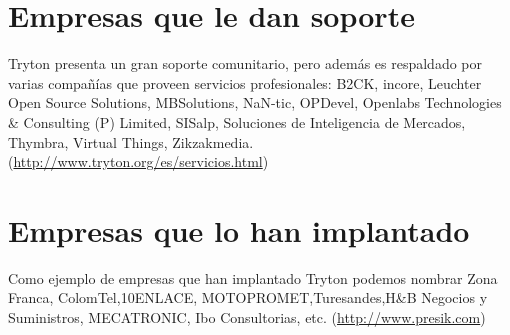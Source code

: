 \documentclass{article}
\begin{document}

\section{Empresas que le dan soporte}

Tryton presenta un gran soporte comunitario, pero además es respaldado por varias compañías que proveen servicios profesionales:
B2CK, incore, Leuchter Open Source Solutions, MBSolutions, NaN-tic, OPDevel, Openlabs Technologies  \& Consulting (P) Limited, SISalp, Soluciones de Inteligencia de Mercados, Thymbra,
Virtual Things, Zikzakmedia.(\url{http://www.tryton.org/es/servicios.html})


\section{Empresas que lo han implantado}
Como ejemplo de empresas que han implantado Tryton podemos nombrar Zona Franca, ColomTel,10ENLACE, MOTOPROMET,Turesandes,H\&B Negocios y Suministros, MECATRONIC, Ibo Consultorias, etc.
(\url{http://www.presik.com})
\end{document}
